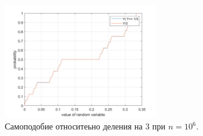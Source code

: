 \documentclass[oneside, final, 12pt]{article}
\begin{document}
	\begin{figure}[h!]
		\centering
		\includegraphics[width=0.6\textwidth]{../code/Task_2/pict/sim_2_vis_ex.png}
		\caption{Самоподобие относитеьно деления на 3 при $n=10^6$. }
    \end{figure}
\end{document}
